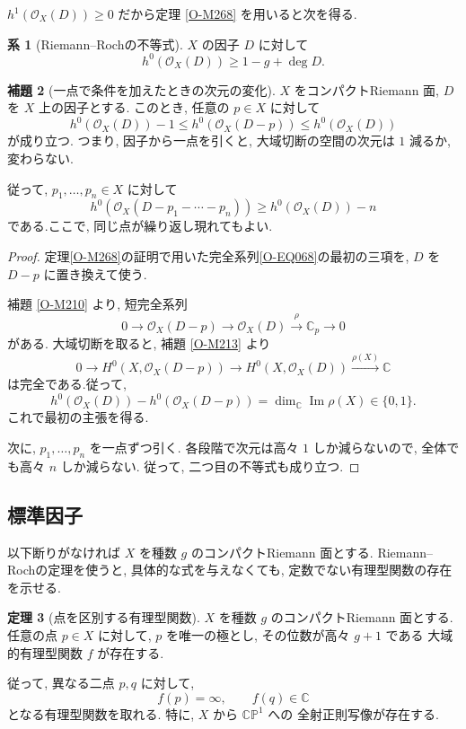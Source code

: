 \documentclass[dvipdfmx,a4paper,11pt]{article} %
\newcommand{\C}{\mathbb{C}}
\theoremstyle{definition}
\newtheorem{thm}{定理}[section]
\numberwithin{equation}{section}
\newtheorem{lem}[thm]{補題}
\newtheorem{cor}[thm]{系}
\begin{document}
$h^1(\mathcal O_X(D))\geq 0$ だから定理 \ref{O-M268} を用いると次を得る. 
\begin{cor}[Riemann--Rochの不等式]\label{O-M271}
$X$ の因子 $D$ に対して
\[
h^0(\mathcal O_X(D))\geq 1-g+\deg D.
\]
\end{cor}

\begin{lem}[一点で条件を加えたときの次元の変化]\label{O-M272}
$X$ をコンパクトRiemann 面, $D$ を $X$ 上の因子とする.
このとき, 任意の $p\in X$ に対して
\[
h^0(\mathcal O_X(D))-1
\leq h^0(\mathcal O_X(D-p))
\leq h^0(\mathcal O_X(D))
\]
が成り立つ.
つまり, 因子から一点を引くと, 
大域切断の空間の次元は $1$ 減るか, 変わらない.

従って, $p_1,\ldots,p_n\in X$ に対して
\[
h^0(\mathcal O_X(D-p_1-\cdots-p_n))
\geq h^0(\mathcal O_X(D))-n
\]
である.ここで, 同じ点が繰り返し現れてもよい.
\end{lem}

\begin{proof}
定理\ref{O-M268}の証明で用いた完全系列\eqref{O-EQ068}の最初の三項を, $D$ を $D-p$ に置き換えて使う.

補題 \ref{O-M210} より, 短完全系列
\[
0\longrightarrow\mathcal O_X(D-p)
\longrightarrow\mathcal O_X(D)
\xrightarrow{\rho}\C_p
\longrightarrow0
\]
がある.
大域切断を取ると, 補題 \ref{O-M213} より
\[
0\longrightarrow H^0(X,\mathcal O_X(D-p))
\longrightarrow H^0(X,\mathcal O_X(D))
\xrightarrow{\rho(X)}\C
\]
は完全である.従って, 
\[
h^0(\mathcal O_X(D))
-h^0(\mathcal O_X(D-p))
=\dim_{\C}\operatorname{Im}\rho(X)
\in\{0,1\}.
\]
これで最初の主張を得る.

次に, $p_1,\ldots,p_n$ を一点ずつ引く.
各段階で次元は高々 $1$ しか減らないので, 
全体でも高々 $n$ しか減らない.
従って, 二つ目の不等式も成り立つ.
\end{proof}


\subsection{標準因子}
\label{O-S048}\label{O-S049}


以下断りがなければ $X$ を種数 $g$ のコンパクトRiemann 面とする.
Riemann--Rochの定理を使うと, 
具体的な式を与えなくても, 定数でない有理型関数の存在を示せる.

\begin{thm}[点を区別する有理型関数]\label{O-M273}
$X$ を種数 $g$ のコンパクトRiemann 面とする.
任意の点 $p\in X$ に対して,
$p$ を唯一の極とし, その位数が高々 $g+1$ である
大域的有理型関数 $f$ が存在する.

従って, 異なる二点 $p,q$ に対して,
\[
f(p)=\infty,\qquad f(q)\in\C
\]
となる有理型関数を取れる.
特に, $X$ から $\C\mathbb P^1$ への
全射正則写像が存在する.
\end{thm}
\end{document}
